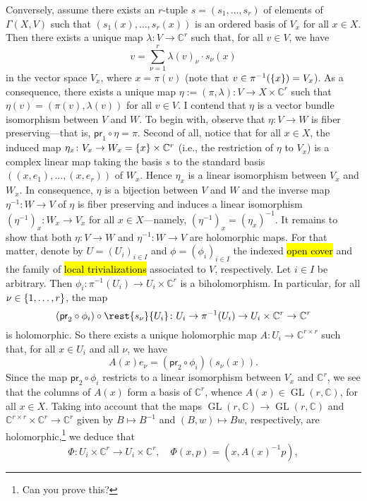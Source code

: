\documentclass[a4paper]{amsart}
\newcommand{\C}{\mathbb{C}}
\newcommand{\pr}[1]{\mathsf{pr}_{#1}}
\theoremstyle{remark}
\numberwithin{equation}{question}
\DeclarePairedDelimiter\set{\{}{\}}
\DeclareMathOperator{\GL}{GL}
\begin{document}
\begin{solution}
Conversely, assume there exists an $r$-tuple $s = (s_1,\dots,s_r)$ of elements of $\Gamma(X,V)$ such that $(s_1(x),\dots,s_r(x))$ is an ordered basis of $V_x$ for all $x \in X$. Then there exists a unique map $\lambda \colon V \to \C^r$ such that, for all $v \in V$, we have
\[
v = \sum_{\nu = 1}^r \lambda(v)_\nu \cdot s_\nu(x)
\]
in the vector space $V_x$, where $x = \pi(v)$ (note that $v \in \pi^{-1}(\set x) = V_x$). As a consequence, there exists a unique map $\eta := (\pi,\lambda) \colon V \to X \times \C^r$ such that $\eta(v) = (\pi(v),\lambda(v))$ for all $v \in V$. I contend that $\eta$ is a vector bundle isomorphism between $V$ and $W$.
To begin with, observe that $\eta \colon V \to W$ is fiber preserving---that is, $\pr1 \circ \eta = \pi$. Second of all, notice that for all $x \in X$, the induced map $\eta_x \colon V_x \to W_x = \set x \times \C^r$ (i.e., the restriction of $\eta$ to $V_x$) is a complex linear map taking the basis $s$ to the standard basis $((x,e_1),\dots,(x,e_r))$ of $W_x$. Hence $\eta_x$ is a linear isomorphism between $V_x$ and $W_x$. In consequence, $\eta$ is a bijection between $V$ and $W$ and the inverse map $\eta^{-1} \colon W \to V$ of $\eta$ is fiber preserving and induces a linear isomorphism $(\eta^{-1})_x \colon W_x \to V_x$ for all $x \in X$---namely, $(\eta^{-1})_x = (\eta_x)^{-1}$. It remains to show that both $\eta \colon V \to W$ and $\eta^{-1} \colon W \to V$ are holomorphic maps. For that matter, denote by $U = (U_i)_{i \in I}$ and $\phi = (\phi_i)_{i \in I}$ the indexed \hl{open cover} and the family of \hl{local trivializations} associated to $V$, respectively. Let $i \in I$ be arbitrary. Then $\phi_i \colon \pi^{-1}(U_i) \to U_i \times \C^r$ is a biholomorphism. In particular, for all $\nu \in \set{1,\dots,r}$, the map
\[
(\pr2 \circ \phi_i) \circ \rest{s_\nu}{U_i} \colon U_i \to \pi^{-1}(U_i) \to U_i \times \C^r \to \C^r
\]
is holomorphic. So there exists a unique holomorphic map $A \colon U_i \to \C^{r \times r}$ such that, for all $x \in U_i$ and all $\nu$, we have
\[
A(x)e_\nu = (\pr2 \circ \phi_i)(s_\nu(x)).
\]
Since the map $\pr2 \circ \phi_i$ restricts to a linear isomorphism between $V_x$ and $\C^r$, we see that the columns of $A(x)$ form a basis of $\C^r$, whence $A(x) \in \GL(r,\C)$, for all $x \in X$.
Taking into account that the maps $\GL(r,\C) \to \GL(r,\C)$ and $\C^{r \times r} \times \C^r \to \C^r$ given by $B \mapsto B^{-1}$ and $(B,w) \mapsto Bw$, respectively, are holomorphic,\footnote{Can you prove this?} we deduce that
\[
\Phi \colon U_i \times \C^r \to U_i \times \C^r, \quad \Phi(x,p) = (x,A(x)^{-1}p),
\]
\end{solution}
\end{document}
